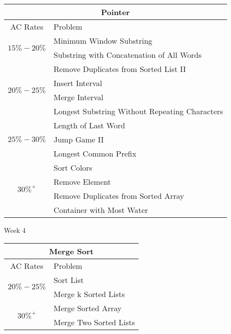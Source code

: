 \documentclass[paper=a4, fontsize=11pt]{scrartcl} %
\begin{document}
\begin{center}
  \vspace{20mm}
  \begin{tabular}{|c|l|}
      \hline
      \multicolumn{2}{|c|}{Pointer} \\
      \hline
      AC Rates      &   Problem     \\
      \hline
      \multirow{2}{*}{$15\%-20\%$}  &    Minimum Window Substring    \\
          & Substring with Concatenation of All Words \\
      \hline
      \multirow{4}{*}{$20\%-25\%$}  &    Remove Duplicates from Sorted List II    \\
          & Insert Interval \\
          & Merge Interval  \\
          & Longest Substring Without Repeating Characters  \\
      \hline
      \multirow{3}{*}{$25\%-30\%$}  &    Length of Last Word    \\
          & Jump Game II  \\
          & Longest Common Prefix \\
      \hline
      \multirow{4}{*}{$30\%^+$}  &  Sort Colors  \\
          & Remove Element \\
          & Remove Duplicates from Sorted Array  \\
          & Container with Most Water \\
      \hline
  \end{tabular}

  \pagebreak

  \begin{center}
    Week 4
  \end{center}

  \begin{tabular}{|c|l|}
      \hline
      \multicolumn{2}{|c|}{Merge Sort} \\
      \hline
      AC Rates      &   Problem     \\
      \hline
      \multirow{2}{*}{$20\%-25\%$}  &    Sort List \\
          & Merge k Sorted Lists  \\
      \hline
      \multirow{2}{*}{$30\%^+$}  &    Merge Sorted Array \\
          & Merge Two Sorted Lists \\
      \hline
  \end{tabular}

  \vspace{10mm}


\end{center}
\end{document}
